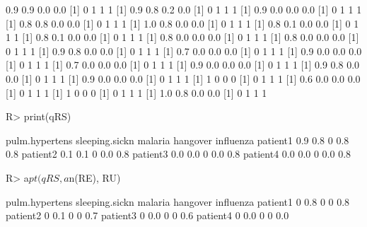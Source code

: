 \documentclass{article}\usepackage[]{graphicx}\usepackage[]{color}
\begin{document}
\begin{Schunk}
% --begin: "comp.quant.atleast"
\begin{Soutput}
[1] 0.9 0.9 0.0 0.0
[1] 0 1 1 1
[1] 0.9 0.8 0.2 0.0
[1] 0 1 1 1
[1] 0.9 0.0 0.0 0.0
[1] 0 1 1 1
[1] 0.8 0.8 0.0 0.0
[1] 0 1 1 1
[1] 1.0 0.8 0.0 0.0
[1] 0 1 1 1
[1] 0.8 0.1 0.0 0.0
[1] 0 1 1 1
[1] 0.8 0.1 0.0 0.0
[1] 0 1 1 1
[1] 0.8 0.0 0.0 0.0
[1] 0 1 1 1
[1] 0.8 0.0 0.0 0.0
[1] 0 1 1 1
[1] 0.9 0.8 0.0 0.0
[1] 0 1 1 1
[1] 0.7 0.0 0.0 0.0
[1] 0 1 1 1
[1] 0.9 0.0 0.0 0.0
[1] 0 1 1 1
[1] 0.7 0.0 0.0 0.0
[1] 0 1 1 1
[1] 0.9 0.0 0.0 0.0
[1] 0 1 1 1
[1] 0.9 0.8 0.0 0.0
[1] 0 1 1 1
[1] 0.9 0.0 0.0 0.0
[1] 0 1 1 1
[1] 1 0 0 0
[1] 0 1 1 1
[1] 0.6 0.0 0.0 0.0
[1] 0 1 1 1
[1] 1 0 0 0
[1] 0 1 1 1
[1] 1.0 0.8 0.0 0.0
[1] 0 1 1 1
\end{Soutput}
\begin{Sinput}
R> print(qRS)
\end{Sinput}
\begin{Soutput}
         pulm.hypertens sleeping.sickn malaria hangover influenza
patient1            0.9            0.8       0      0.8       0.8
patient2            0.1            0.1       0      0.0       0.8
patient3            0.0            0.0       0      0.0       0.8
patient4            0.0            0.0       0      0.0       0.8
\end{Soutput}
%
% --end: "comp.quant.atleast"
\end{Schunk}

\begin{Schunk}
% --begin: "comp.quant.combined"
\begin{Sinput}
R> a$pt(qRS, a$n(RE), RU)
\end{Sinput}
\begin{Soutput}
         pulm.hypertens sleeping.sickn malaria hangover influenza
patient1              0            0.8       0        0       0.8
patient2              0            0.1       0        0       0.7
patient3              0            0.0       0        0       0.6
patient4              0            0.0       0        0       0.0
\end{Soutput}
%
% --end: "comp.quant.combined"
\end{Schunk}
\end{document}
